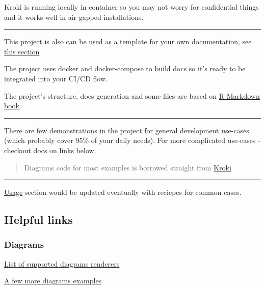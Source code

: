 \documentclass[
  12pt,
  a4paper,
  12pt,
  oneside,
  openany]{book}
\begin{document}
Kroki is running locally in container so you may not worry for confidential things and it works well in air gapped installations.

\begin{center}\rule{0.5\linewidth}{0.5pt}\end{center}

This project is also can be used as a template for your own documentation, see \protect\hyperlink{template}{this section}

The project uses docker and docker-compose to build docs so it's ready to be integrated into your CI/CD flow.

The project's structure, docs generation and some files are based on \href{https://github.com/rstudio/rmarkdown-book}{R Markdown book}

\begin{center}\rule{0.5\linewidth}{0.5pt}\end{center}

There are few demonstrations in the project for general development use-cases (which probably cover 95\% of your daily needs). For more complicated use-cases - checkout docs on links below.

\begin{quote}
Diagrams code for most examples is borrowed straight from \href{https://kroki.io/examples.html}{Kroki}
\end{quote}

\begin{center}\rule{0.5\linewidth}{0.5pt}\end{center}

\protect\hyperlink{usage}{Usage} section would be updated eventually with reciepes for common cases.

\hfill\break
\hfill\break

\hypertarget{links}{%
\subsection*{Helpful links}\label{links}}


\hypertarget{links-diagrams}{%
\subsubsection*{Diagrams}\label{links-diagrams}}


\href{https://kroki.io/\#support}{List of supported diagrams renderers}

\href{https://kroki.io/examples.html}{A few more diagrams examples}
\end{document}

